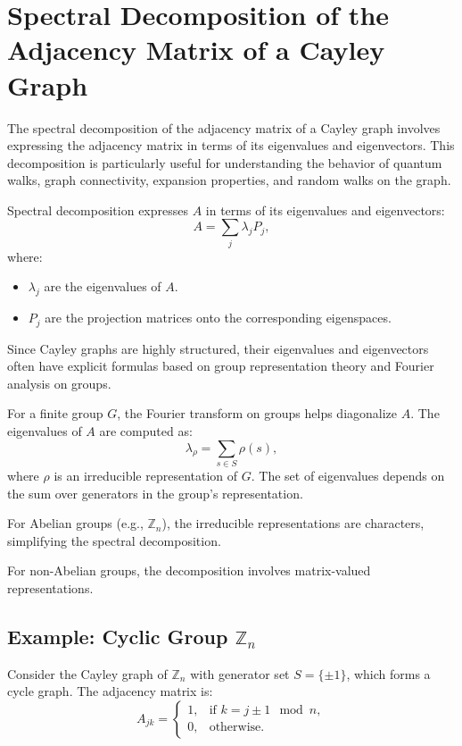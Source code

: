 \documentclass[11pt]{article}
\theoremstyle{definition}
\begin{document}
\section*{Spectral Decomposition of the Adjacency Matrix of a Cayley Graph}

The spectral decomposition of the adjacency matrix of a Cayley graph involves expressing the adjacency matrix in terms of its eigenvalues and eigenvectors. This decomposition is particularly useful for understanding the behavior of quantum walks, graph connectivity, expansion properties, and random walks on the graph.

Spectral decomposition expresses \( A \) in terms of its eigenvalues and eigenvectors:
\[
A = \sum_{j} \lambda_j P_j,
\]
where:
\begin{itemize}
    \item \( \lambda_j \) are the eigenvalues of \( A \).
    \item \( P_j \) are the projection matrices onto the corresponding eigenspaces.
\end{itemize}

Since Cayley graphs are highly structured, their eigenvalues and eigenvectors often have explicit formulas based on group representation theory and Fourier analysis on groups.

For a finite group \( G \), the Fourier transform on groups helps diagonalize \( A \). The eigenvalues of \( A \) are computed as:
\[
\lambda_\rho = \sum_{s \in S} \rho(s),
\]
where \( \rho \) is an irreducible representation of \( G \). The set of eigenvalues depends on the sum over generators in the group's representation.

For Abelian groups (e.g., \( \mathbb{Z}_n \)), the irreducible representations are characters, simplifying the spectral decomposition.

For non-Abelian groups, the decomposition involves matrix-valued representations.

\subsection*{Example: Cyclic Group \( \mathbb{Z}_n \)}

Consider the Cayley graph of \( \mathbb{Z}_n \) with generator set \( S = \{\pm 1\} \), which forms a cycle graph. The adjacency matrix is:
\[
A_{jk} =
\begin{cases}
1, & \text{if } k = j \pm 1 \mod n, \\
0, & \text{otherwise}.
\end{cases}
\]
\end{document}
